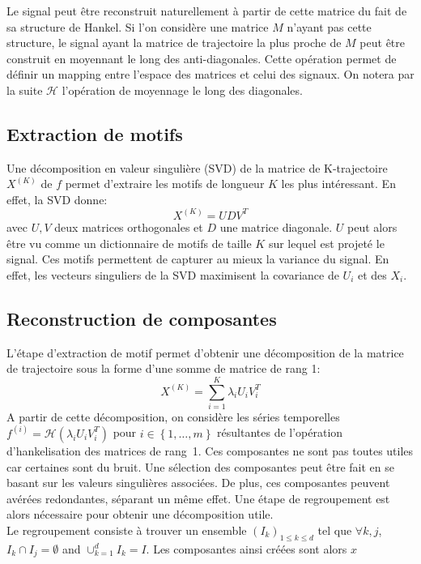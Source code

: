\documentclass{gretsi}
\def\HH{\mathcal H}
\begin{document}
Le signal peut être reconstruit naturellement à partir de cette matrice du fait de sa structure de Hankel. Si l'on considère une matrice $M$ n'ayant pas cette structure, le signal ayant la matrice de trajectoire la plus proche de $M$ peut être construit en moyennant le long des anti-diagonales. Cette opération permet de définir un mapping entre l'espace des matrices et celui des signaux. On notera par la suite $\HH$ l'opération de moyennage le long des diagonales.

\subsection{Extraction de motifs}

Une décomposition en valeur singulière (SVD) de la matrice de K-trajectoire $X^{(K)}$ de $f$ permet d'extraire les motifs de longueur $K$ les plus intéressant. En effet, la SVD donne: 
$$
X^{(K)} = U D V^T
$$ avec $U, V$ deux matrices orthogonales et $D$ une matrice diagonale. $U$ peut alors être vu comme un dictionnaire de motifs de taille $K$ sur lequel est projeté le signal. Ces motifs permettent de capturer au mieux la variance du signal. En effet, les vecteurs singuliers de la SVD maximisent la covariance de $U_i$ et des $X_i$.

\subsection{Reconstruction de composantes}

L'étape d'extraction de motif permet d'obtenir une décomposition de la matrice de trajectoire sous la forme d'une somme de matrice de rang 1:$$
X^{(K)} = \sum_{i=1}^K \lambda_i U_iV_i^T 
$$A partir de cette décomposition, on considère les séries temporelles $f^{(i)} = \HH(\lambda_iU_iV_i^T)$ pour $i \in \left \{ 1,\dots, m \right \}$ résultantes de l'opération d'hankelisation des matrices de \mbox{rang 1}. Ces composantes ne sont pas toutes utiles car certaines sont du bruit. Une sélection des composantes peut être fait en se basant sur les valeurs singulières associées. De plus, ces composantes peuvent avérées redondantes, séparant un même effet. Une étape de regroupement est alors nécessaire pour obtenir une décomposition utile.\\

Le regroupement consiste à trouver un ensemble $(I_k)_{1 \le k \le d}$ tel que $\forall k, j$, $I_k \cap I_j = \emptyset$ and $\displaystyle \cup_{k=1}^d I_k = I$. Les composantes ainsi créées sont alors $x$
\end{document}
